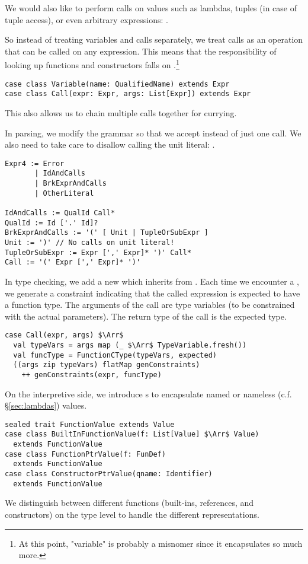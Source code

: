 We would also like to perform calls on values such as lambdas, tuples (in case of tuple access), or even arbitrary expressions: .

So instead of treating variables and calls separately, we treat calls as an operation that can be called on any expression. This means that the responsibility of looking up functions and constructors falls on .\footnote{At this point, "variable" is probably a misnomer since it encapsulates so much more.}
\begin{lstlisting}
case class Variable(name: QualifiedName) extends Expr
case class Call(expr: Expr, args: List[Expr]) extends Expr
\end{lstlisting}
This also allows us to chain multiple calls together for currying.

In parsing, we modify the grammar so that we accept  instead of just one call. We also need to take care to disallow calling the unit literal: \code{()()}.

\begin{lstlisting}
Expr4 := Error
       | IdAndCalls
       | BrkExprAndCalls
       | OtherLiteral

IdAndCalls := QualId Call*
QualId := Id ['.' Id]?
BrkExprAndCalls := '(' [ Unit | TupleOrSubExpr ]
Unit := ')' // No calls on unit literal!
TupleOrSubExpr := Expr [',' Expr]* ')' Call*
Call := '(' Expr [',' Expr]* ')'
\end{lstlisting}

\noindent
In type checking, we add a new  which inherits from . Each time we encounter a , we generate a  constraint indicating that the called expression is expected to have a function type. The arguments of the call are type variables (to be constrained with the actual parameters). The return type of the call is the expected type.
\begin{lstlisting}
case Call(expr, args) $\Arr$
  val typeVars = args map (_ $\Arr$ TypeVariable.fresh())
  val funcType = FunctionCType(typeVars, expected)
  ((args zip typeVars) flatMap genConstraints)
    ++ genConstraints(expr, funcType)
\end{lstlisting}

\noindent
On the interpretive side, we introduce s to encapsulate named or nameless (c.f. §\ref{sec:lambdas}) values.
\begin{lstlisting}
sealed trait FunctionValue extends Value
case class BuiltInFunctionValue(f: List[Value] $\Arr$ Value)
  extends FunctionValue
case class FunctionPtrValue(f: FunDef)
  extends FunctionValue
case class ConstructorPtrValue(qname: Identifier)
  extends FunctionValue
\end{lstlisting}
We distinguish between different functions (built-ins, references, and constructors) on the type level to handle the different representations.


